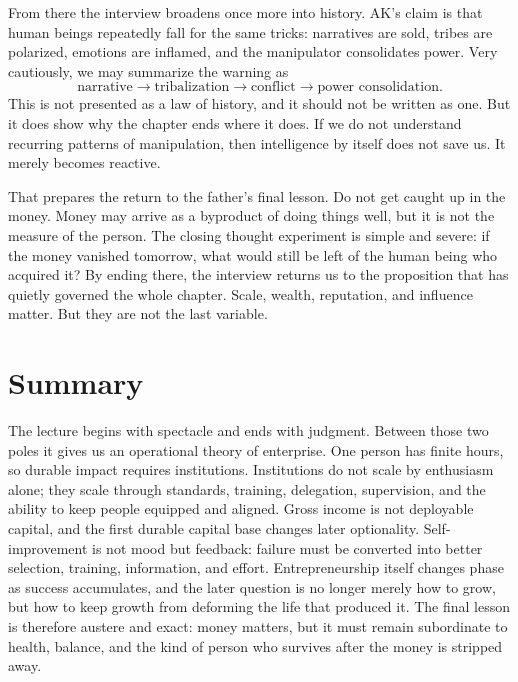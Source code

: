 From there the interview broadens once more into history. AK's claim is that human beings repeatedly fall for the same tricks: narratives are sold, tribes are polarized, emotions are inflamed, and the manipulator consolidates power. Very cautiously, we may summarize the warning as
\begin{equation}
\text{narrative}
\longrightarrow
\text{tribalization}
\longrightarrow
\text{conflict}
\longrightarrow
\text{power consolidation}.
\end{equation}
This is not presented as a law of history, and it should not be written as one. But it does show why the chapter ends where it does. If we do not understand recurring patterns of manipulation, then intelligence by itself does not save us. It merely becomes reactive.

That prepares the return to the father's final lesson. Do not get caught up in the money. Money may arrive as a byproduct of doing things well, but it is not the measure of the person. The closing thought experiment is simple and severe: if the money vanished tomorrow, what would still be left of the human being who acquired it? By ending there, the interview returns us to the proposition that has quietly governed the whole chapter. Scale, wealth, reputation, and influence matter. But they are not the last variable.

\section{Summary}

The lecture begins with spectacle and ends with judgment. Between those two poles it gives us an operational theory of enterprise. One person has finite hours, so durable impact requires institutions. Institutions do not scale by enthusiasm alone; they scale through standards, training, delegation, supervision, and the ability to keep people equipped and aligned. Gross income is not deployable capital, and the first durable capital base changes later optionality. Self-improvement is not mood but feedback: failure must be converted into better selection, training, information, and effort. Entrepreneurship itself changes phase as success accumulates, and the later question is no longer merely how to grow, but how to keep growth from deforming the life that produced it. The final lesson is therefore austere and exact: money matters, but it must remain subordinate to health, balance, and the kind of person who survives after the money is stripped away.